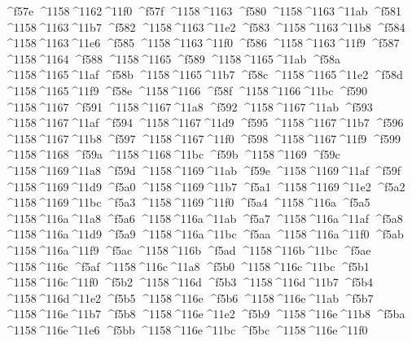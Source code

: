 \checkit ^^^^f57e ^^^^1158^^^^1162^^^^11f0
\checkit ^^^^f57f ^^^^1158^^^^1163
\checkit ^^^^f580 ^^^^1158^^^^1163^^^^11ab
\checkit ^^^^f581 ^^^^1158^^^^1163^^^^11b7
\checkit ^^^^f582 ^^^^1158^^^^1163^^^^11e2
\checkit ^^^^f583 ^^^^1158^^^^1163^^^^11b8
\checkit ^^^^f584 ^^^^1158^^^^1163^^^^11e6
\checkit ^^^^f585 ^^^^1158^^^^1163^^^^11f0
\checkit ^^^^f586 ^^^^1158^^^^1163^^^^11f9
\checkit ^^^^f587 ^^^^1158^^^^1164
\checkit ^^^^f588 ^^^^1158^^^^1165
\checkit ^^^^f589 ^^^^1158^^^^1165^^^^11ab
\checkit ^^^^f58a ^^^^1158^^^^1165^^^^11af
\checkit ^^^^f58b ^^^^1158^^^^1165^^^^11b7
\checkit ^^^^f58c ^^^^1158^^^^1165^^^^11e2
\checkit ^^^^f58d ^^^^1158^^^^1165^^^^11f9
\checkit ^^^^f58e ^^^^1158^^^^1166
\checkit ^^^^f58f ^^^^1158^^^^1166^^^^11bc
\checkit ^^^^f590 ^^^^1158^^^^1167
\checkit ^^^^f591 ^^^^1158^^^^1167^^^^11a8
\checkit ^^^^f592 ^^^^1158^^^^1167^^^^11ab
\checkit ^^^^f593 ^^^^1158^^^^1167^^^^11af
\checkit ^^^^f594 ^^^^1158^^^^1167^^^^11d9
\checkit ^^^^f595 ^^^^1158^^^^1167^^^^11b7
\checkit ^^^^f596 ^^^^1158^^^^1167^^^^11b8
\checkit ^^^^f597 ^^^^1158^^^^1167^^^^11f0
\checkit ^^^^f598 ^^^^1158^^^^1167^^^^11f9
\checkit ^^^^f599 ^^^^1158^^^^1168
\checkit ^^^^f59a ^^^^1158^^^^1168^^^^11bc
\checkit ^^^^f59b ^^^^1158^^^^1169
\checkit ^^^^f59c ^^^^1158^^^^1169^^^^11a8
\checkit ^^^^f59d ^^^^1158^^^^1169^^^^11ab
\checkit ^^^^f59e ^^^^1158^^^^1169^^^^11af
\checkit ^^^^f59f ^^^^1158^^^^1169^^^^11d9
\checkit ^^^^f5a0 ^^^^1158^^^^1169^^^^11b7
\checkit ^^^^f5a1 ^^^^1158^^^^1169^^^^11e2
\checkit ^^^^f5a2 ^^^^1158^^^^1169^^^^11bc
\checkit ^^^^f5a3 ^^^^1158^^^^1169^^^^11f0
\checkit ^^^^f5a4 ^^^^1158^^^^116a
\checkit ^^^^f5a5 ^^^^1158^^^^116a^^^^11a8
\checkit ^^^^f5a6 ^^^^1158^^^^116a^^^^11ab
\checkit ^^^^f5a7 ^^^^1158^^^^116a^^^^11af
\checkit ^^^^f5a8 ^^^^1158^^^^116a^^^^11d9
\checkit ^^^^f5a9 ^^^^1158^^^^116a^^^^11bc
\checkit ^^^^f5aa ^^^^1158^^^^116a^^^^11f0
\checkit ^^^^f5ab ^^^^1158^^^^116a^^^^11f9
\checkit ^^^^f5ac ^^^^1158^^^^116b
\checkit ^^^^f5ad ^^^^1158^^^^116b^^^^11bc
\checkit ^^^^f5ae ^^^^1158^^^^116c
\checkit ^^^^f5af ^^^^1158^^^^116c^^^^11a8
\checkit ^^^^f5b0 ^^^^1158^^^^116c^^^^11bc
\checkit ^^^^f5b1 ^^^^1158^^^^116c^^^^11f0
\checkit ^^^^f5b2 ^^^^1158^^^^116d
\checkit ^^^^f5b3 ^^^^1158^^^^116d^^^^11b7
\checkit ^^^^f5b4 ^^^^1158^^^^116d^^^^11e2
\checkit ^^^^f5b5 ^^^^1158^^^^116e
\checkit ^^^^f5b6 ^^^^1158^^^^116e^^^^11ab
\checkit ^^^^f5b7 ^^^^1158^^^^116e^^^^11b7
\checkit ^^^^f5b8 ^^^^1158^^^^116e^^^^11e2
\checkit ^^^^f5b9 ^^^^1158^^^^116e^^^^11b8
\checkit ^^^^f5ba ^^^^1158^^^^116e^^^^11e6
\checkit ^^^^f5bb ^^^^1158^^^^116e^^^^11bc
\checkit ^^^^f5bc ^^^^1158^^^^116e^^^^11f0
